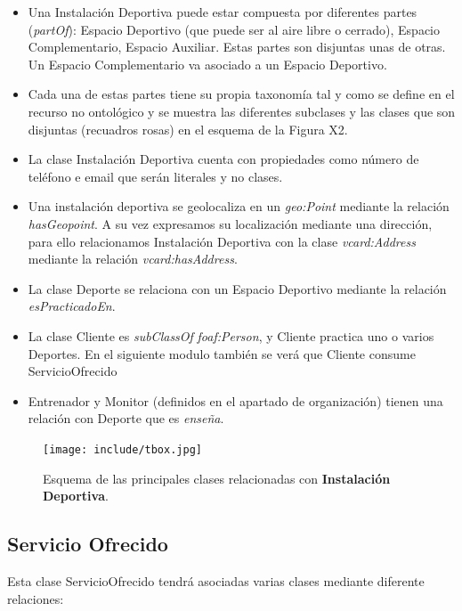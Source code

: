 \documentclass[a4paper,12pt]{article}
\begin{document}
	\begin{itemize}
		\item Una Instalación Deportiva puede estar compuesta por diferentes partes (\textit{partOf}):
Espacio Deportivo (que puede ser al aire libre o cerrado), Espacio Complementario,
Espacio Auxiliar. Estas partes son disjuntas unas de otras. Un Espacio
Complementario va asociado a un Espacio Deportivo.
		\item Cada una de estas partes tiene su propia taxonomía tal y como se define en el recurso no
	ontológico y se muestra las diferentes subclases y las clases que son disjuntas (recuadros
rosas) en el esquema de la Figura X2.
		\item La clase Instalación Deportiva cuenta con propiedades como número de teléfono e email que
serán literales y no clases.
		\item Una instalación deportiva se geolocaliza en un \textit{geo:Point} mediante la relación
\textit{hasGeopoint}. A su vez expresamos su localización mediante una dirección, para ello
relacionamos Instalación Deportiva con la clase \textit{vcard:Address} mediante la relación
\textit{vcard:hasAddress}.
		\item La clase Deporte se relaciona con un Espacio Deportivo mediante la relación
\textit{esPracticadoEn}.
		\item La clase Cliente es \textit{subClassOf} \textit{foaf:Person}, y Cliente practica uno o varios Deportes.
En el siguiente modulo también se verá que Cliente consume ServicioOfrecido
		\item Entrenador y Monitor (definidos en el apartado de organización) tienen una relación
	con Deporte que es \textit{enseña}.
	\end{itemize}

	\begin{figure}[H]
		\centering
		\texttt{[image: include/tbox.jpg]}
		\caption{Esquema de las principales clases relacionadas con \textbf{Instalación Deportiva}.}
	\end{figure}
		
	\subsection{Servicio Ofrecido}
	
	Esta clase ServicioOfrecido tendrá asociadas varias clases mediante diferente relaciones:
	
\end{document}
